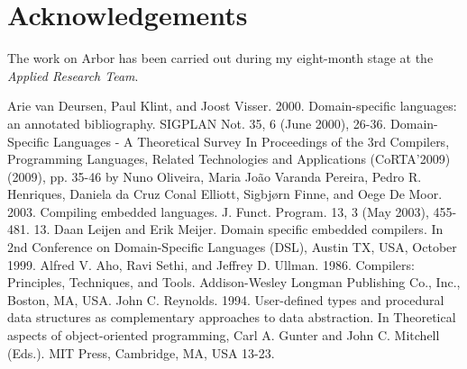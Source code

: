 \documentclass[12pt]{article} %
\newcommand{\A}{Arbor}
\begin{document}
\section{Acknowledgements}
The work on \A{} has been carried out during my eight-month stage at the \emph{Applied Research Team}. 
\begin{thebibliography}{99}
Arie van Deursen, Paul Klint, and Joost Visser. 2000. Domain-specific languages: an annotated bibliography. SIGPLAN Not. 35, 6 (June 2000), 26-36. 
Domain-Speciﬁc Languages - A Theoretical Survey In Proceedings of the 3rd Compilers, Programming Languages, Related Technologies and Applications (CoRTA'2009) (2009), pp. 35-46 by Nuno Oliveira, Maria João Varanda Pereira, Pedro R. Henriques, Daniela da Cruz
Conal Elliott, Sigbjørn Finne, and Oege De Moor. 2003. Compiling embedded languages. J. Funct. Program. 13, 3 (May 2003), 455-481.
13.	Daan Leijen and Erik Meijer. Domain specific embedded compilers. In 2nd Conference on Domain-Specific Languages (DSL), Austin TX, USA, October 1999.
Alfred V. Aho, Ravi Sethi, and Jeffrey D. Ullman. 1986. Compilers: Principles, Techniques, and Tools. Addison-Wesley Longman Publishing Co., Inc., Boston, MA, USA.
John C. Reynolds. 1994. User-defined types and procedural data structures as complementary approaches to data abstraction. In Theoretical aspects of object-oriented programming, Carl A. Gunter and John C. Mitchell (Eds.). MIT Press, Cambridge, MA, USA 13-23. 

\end{thebibliography}


\end{document}
